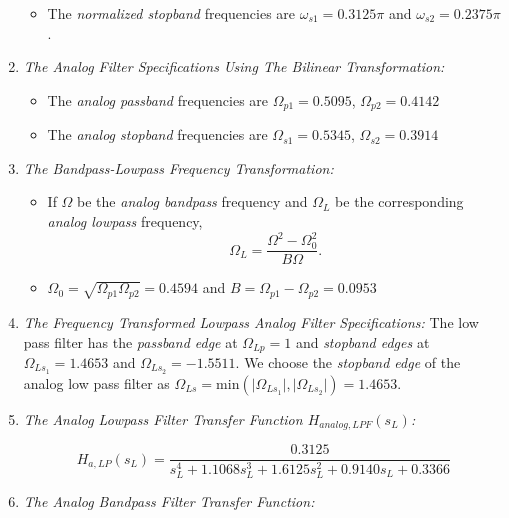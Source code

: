 \documentclass{article}
\begin{document}
\begin{enumerate}
\begin{itemize}
\item The {\em normalized stopband} frequencies are $\omega_{s1} = 0.3125 \pi$  and $\omega_{s2} =  0.2375 \pi$.

\end{itemize}

\item {\em The Analog Filter Specifications Using The Bilinear Transformation:}

\begin{itemize}
\item The {\em analog  passband} frequencies are $\Omega_{p1} = 0.5095$, $\Omega_{p2} = 0.4142$
\item The {\em analog  stopband} frequencies are $\Omega_{s1} = 0.5345$, $\Omega_{s2} = 0.3914$
\end{itemize}

\item {\em The Bandpass-Lowpass Frequency Transformation:}

\begin{itemize}

\item If $\Omega$ be the {\em analog bandpass} frequency and $\Omega_L$ be the corresponding {\em analog lowpass} frequency,
\begin{equation}
\Omega_L = \frac{\Omega^2 - \Omega_0^2}{B\Omega}.
\end{equation}

\item $\Omega_0 = \sqrt{\Omega_{p1}\Omega_{p2}} = 0.4594$ and $B = \Omega_{p1} - \Omega_{p2} = 0.0953$
\end{itemize}

\item {\em The Frequency Transformed Lowpass Analog Filter Specifications:}
The low pass filter has
the {\em passband edge} at $\Omega_{Lp} = 1$ and {\em stopband edges} at $\Omega_{Ls_1} = 1.4653$ and $\Omega_{Ls_2} = -1.5511$.  We choose the {\em stopband edge} of the analog low pass filter as $\Omega_{Ls} = \mbox{min}(\vert \Omega_{Ls_1}\vert,\vert \Omega_{Ls_2}\vert) = 1.4653$.

\item {\em The Analog Lowpass Filter Transfer Function $H_{analog,LPF}(s_L)$:}  

\begin{equation}
\label{lpfinal}
H_{a,LP}(s_L) = \frac{0.3125}{s_L^4 + 1.1068s_L^3 + 1.6125s_L^2+0.9140s_L + 0.3366}
\end{equation}

\item {\em The Analog Bandpass Filter Transfer Function:}  


\end{enumerate}
\end{document}
